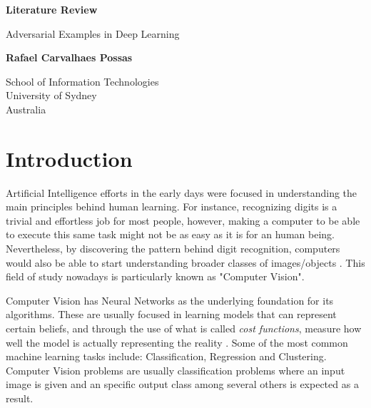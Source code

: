 \documentclass{article}
\begin{document}
\begin{titlepage}
    \begin{center}
        \vspace*{1cm}
        \huge
        \textbf{Literature Review}
        
        \vspace{0.5cm}
        \LARGE
        Adversarial Examples in Deep Learning

        
        \vspace{1.5cm}
        
        \textbf{Rafael Carvalhaes Possas}
        
        \vfill
        
        \vspace{0.8cm}
        
        
        School of Information Technologies\\
        University of Sydney\\
        Australia\\

        
    \end{center}
\end{titlepage}
\section{Introduction}\label{sec:intro}


Artificial Intelligence efforts in the early days were focused in understanding the main principles behind human learning. For instance, recognizing digits is a trivial and effortless job for most people, however, making a computer to be able to execute this same task might not be as easy as it is for an human being. Nevertheless, by discovering the pattern behind digit recognition, computers would also be able to start understanding broader classes of images/objects \cite{krizhevsky2012}. This field of study nowadays is particularly known as "Computer Vision".

Computer Vision has Neural Networks as the underlying foundation for its algorithms. These are usually  focused in learning models that can represent certain beliefs, and through the use of what is called \textit{cost functions}, measure how well the model is actually representing the reality \cite{goodfellow2016_book}. Some of the most common machine learning tasks include: Classification, Regression and Clustering. Computer Vision problems are usually classification problems where an input image is given and an specific output class among several others is expected as a result. 
\end{document}
